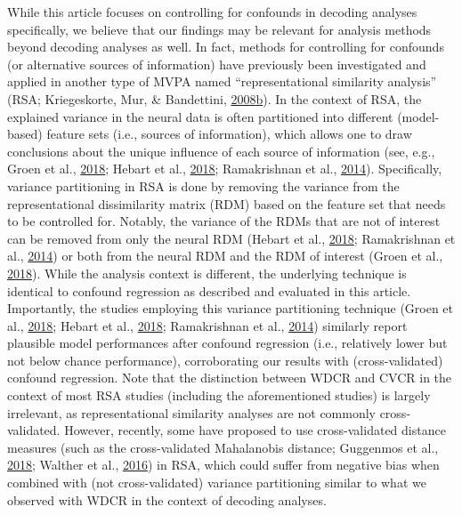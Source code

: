 \documentclass[11pt,american,]{memoir} %
\begin{document}
While this article focuses on controlling for confounds in decoding analyses specifically, we believe that our findings may be relevant for analysis methods beyond decoding analyses as well. In fact, methods for controlling for confounds (or alternative sources of information) have previously been investigated and applied in another type of MVPA named ``representational similarity analysis'' (RSA; Kriegeskorte, Mur, \& Bandettini, \protect\hyperlink{ref-kriegeskorte2008representational}{2008}\protect\hyperlink{ref-kriegeskorte2008representational}{b}). In the context of RSA, the explained variance in the neural data is often partitioned into different (model-based) feature sets (i.e., sources of information), which allows one to draw conclusions about the unique influence of each source of information (see, e.g., Groen et al., \protect\hyperlink{ref-Groen2018-qo}{2018}; Hebart et al., \protect\hyperlink{ref-Hebart2018-dz}{2018}; Ramakrishnan et al., \protect\hyperlink{ref-Ramakrishnan2014-ki}{2014}). Specifically, variance partitioning in RSA is done by removing the variance from the representational dissimilarity matrix (RDM) based on the feature set that needs to be controlled for. Notably, the variance of the RDMs that are not of interest can be removed from only the neural RDM (Hebart et al., \protect\hyperlink{ref-Hebart2018-dz}{2018}; Ramakrishnan et al., \protect\hyperlink{ref-Ramakrishnan2014-ki}{2014}) or both from the neural RDM and the RDM of interest (Groen et al., \protect\hyperlink{ref-Groen2018-qo}{2018}). While the analysis context is different, the underlying technique is identical to confound regression as described and evaluated in this article. Importantly, the studies employing this variance partitioning technique (Groen et al., \protect\hyperlink{ref-Groen2018-qo}{2018}; Hebart et al., \protect\hyperlink{ref-Hebart2018-dz}{2018}; Ramakrishnan et al., \protect\hyperlink{ref-Ramakrishnan2014-ki}{2014}) similarly report plausible model performances after confound regression (i.e., relatively lower but not below chance performance), corroborating our results with (cross-validated) confound regression. Note that the distinction between WDCR and CVCR in the context of most RSA studies (including the aforementioned studies) is largely irrelevant, as representational similarity analyses are not commonly cross-validated. However, recently, some have proposed to use cross-validated distance measures (such as the cross-validated Mahalanobis distance; Guggenmos et al., \protect\hyperlink{ref-Guggenmos2018-rr}{2018}; Walther et al., \protect\hyperlink{ref-Walther2016-je}{2016}) in RSA, which could suffer from negative bias when combined with (not cross-validated) variance partitioning similar to what we observed with WDCR in the context of decoding analyses.
\end{document}
